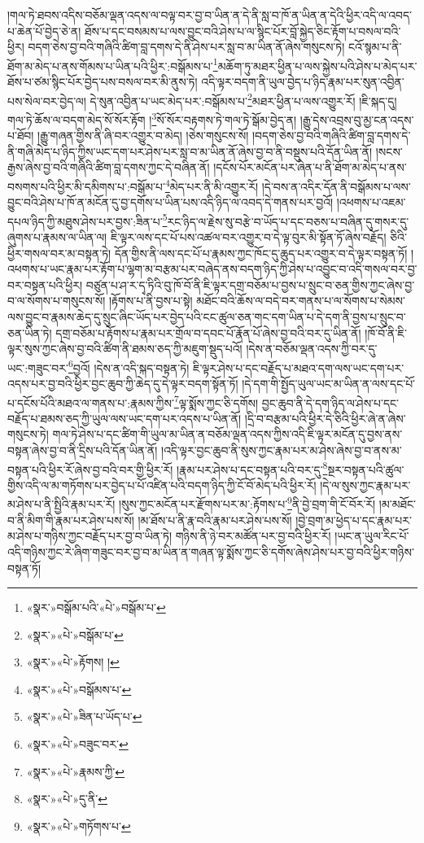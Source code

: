།གལ་ཏེ་ཐབས་འདིས་བཅོམ་ལྡན་འདས་ལ་བལྟ་བར་བྱ་བ་ཡིན་ན་དེ་ནི་སླ་བ་ཁོ་ན་ཡིན་ན་དེའི་ཕྱིར་འདི་ལ་འབད་པ་ཆེན་པོ་བྱེད་ཅེ་ན། ཐོས་པ་དང་བསམས་པ་ལས་བྱུང་བའི་ཤེས་པ་ལ་སྙིང་པོར་བློ་སྐྱེད་ཅིང་རྟོག་པ་བསལ་བའི་ཕྱིར། བདག་ཅེས་བྱ་བའི་གཞིའི་ཚིག་བླ་དགས་དེ་ནི་ཤེས་པར་སླ་བ་མ་ཡིན་ནོ་ཞེས་གསུངས་ཏེ། ངའོ་སྙམ་པ་ནི་ཐོག་མ་མེད་པ་ནས་གོམས་པ་ཡིན་པའི་ཕྱིར་:བསྒོམས་པ་\footnote{«སྣར་»བསྒོམ་པའི་«པེ་»བསྒོམ་པ་}མཆོག་ཏུ་མཐར་ཕྱིན་པ་ལས་སྐྱེས་པའི་ཤེས་པ་མེད་པར་ཐོས་པ་ཙམ་སྙིང་པོར་བྱེད་པས་བསལ་བར་མི་ནུས་ཏེ། འདི་ལྟར་བདག་ནི་ཡུལ་བྱེད་པ་ཉིད་རྣམ་པར་སུན་འབྱིན་པས་སེལ་བར་བྱེད་ལ། དེ་སུན་འབྱིན་པ་ཡང་མེད་པར་:བསྒོམས་པ་\footnote{«སྣར་»«པེ་»བསྒོམ་པ་}མཐར་ཕྱིན་པ་ལས་འགྱུར་རོ། །ཇི་སྐད་དུ། གལ་ཏེ་ཆོས་ལ་བདག་མེད་སོ་སོར་རྟོག །\footnote{«སྣར་»«པེ་»རྟོགས། །}སོ་སོར་བརྟགས་ཏེ་གལ་ཏེ་སྒོམ་བྱེད་ན། །རྒྱུ་དེས་འབྲས་བུ་མྱ་ངན་འདས་པ་ཐོབ། །རྒྱུ་གཞན་གྱིས་ནི་ཞི་བར་འགྱུར་བ་མེད། །ཅེས་གསུངས་སོ། །བདག་ཅེས་བྱ་བའི་གཞིའི་ཚིག་བླ་དགས་དེ་ནི་གཞི་མེད་པ་ཉིད་ཀྱིས་ཡང་དག་པར་ཤེས་པར་སླ་བ་མ་ཡིན་ནོ་ཞེས་བྱ་བ་ནི་བསྡུས་པའི་དོན་ཡིན་ནོ། །སངས་རྒྱས་ཞེས་བྱ་བའི་གཞིའི་ཚིག་བླ་དགས་ཀྱང་དེ་བཞིན་ནོ། །དངོས་པོར་མངོན་པར་ཞེན་པ་ནི་ཐོག་མ་མེད་པ་ནས་བསགས་པའི་ཕྱིར་མི་དམིགས་པ་:བསྒོམ་པ་\footnote{«སྣར་»«པེ་»བསྒོམས་པ་}མེད་པར་ནི་མི་འགྱུར་རོ། །དེ་བས་ན་འདིར་དོན་ནི་བསྒོམས་པ་ལས་བྱུང་བའི་ཤེས་པ་ཁོ་ན་མངོན་དུ་བྱ་དགོས་པ་ཡིན་པས་འདི་ཉིད་ལ་འབད་དེ་གནས་པར་བྱའོ། །འཕགས་པ་འཇམ་དཔལ་ཉིད་ཀྱི་མཐུས་ཤེས་པར་བྱས་:ཟིན་པ་\footnote{«སྣར་»«པེ་»ཟིན་པ་ཡོད་པ་}རང་ཉིད་ལ་རྗེས་སུ་བརྩེ་བ་ཡོད་པ་དང་བཅས་པ་བཞིན་དུ་གསར་དུ་ཞུགས་པ་རྣམས་ལ་ཡིན་ལ། ཇི་ལྟར་ལས་དང་པོ་པས་འཚལ་བར་འགྱུར་བ་དེ་ལྟ་བུར་མི་སྟོན་ཏོ་ཞེས་བརྗོད། ཅིའི་ཕྱིར་གསལ་བར་མ་བསྟན་ཏེ། དོན་གྱིས་ནི་ལས་དང་པོ་པ་རྣམས་ཀྱང་ཁོང་དུ་ཆུད་པར་འགྱུར་བ་དེ་ལྟར་བསྟན་ཏོ། །འཕགས་པ་ཡང་རྣམ་པར་རྟོག་པ་ལྷག་མ་བརྩམ་པར་བཞེད་ནས་བདག་ཉིད་ཀྱི་ཤེས་པ་འབྱུང་བ་འདི་གསལ་བར་བྱ་བར་བསྟན་པའི་ཕྱིར། བཙུན་པ་ཤ་ར་དྭ་ཏིའི་བུ་ཁོ་བོ་ནི་ཇི་ལྟར་དགྲ་བཅོམ་པ་བྱས་པ་སྲུང་བ་ཅན་གྱིས་ཀྱང་ཞེས་བྱ་བ་ལ་སོགས་པ་གསུངས་སོ། །རྟོགས་པ་ནི་བྱས་པ་སྟེ། མཐོང་བའི་ཆོས་ལ་བདེ་བར་གནས་པ་ལ་སོགས་པ་སེམས་ལས་བྱུང་བ་རྣམས་ཆེད་དུ་སྲུང་ཞིང་ཡོད་པར་བྱེད་པའི་ངང་ཚུལ་ཅན་གང་དག་ཡིན་པ་དེ་དག་ནི་བྱས་པ་སྲུང་བ་ཅན་ཡིན་ཏེ། དགྲ་བཅོམ་པ་རྟོགས་པ་རྣམ་པར་གྲོལ་བ་དབང་པོ་རྣོན་པོ་ཞེས་བྱ་བའི་བར་དུ་ཡིན་ནོ། །ཁོ་བོ་ནི་ཇི་ལྟར་སུས་ཀྱང་ཞེས་བྱ་བའི་ཚིག་ནི་ཐམས་ཅད་ཀྱི་མཇུག་སྡུད་པའོ། །དེས་ན་བཅོམ་ལྡན་འདས་ཀྱི་བར་དུ་ཡང་:གཟུང་བར་\footnote{«སྣར་»«པེ་»བཟུང་བར་}བྱའོ། །དེས་ན་འདི་སྐད་བསྟན་ཏེ། ཇི་ལྟར་ཤེས་པ་དང་བརྗོད་པ་མཐའ་དག་ལས་ཡང་དག་པར་འདས་པར་བྱ་བའི་ཕྱིར་བྱང་ཆུབ་ཀྱི་ཆེད་དུ་དེ་ལྟར་བདག་སྟོན་ཏོ། །དེ་དག་གི་སྤྱོད་ཡུལ་ཡང་མ་ཡིན་ན་ལས་དང་པོ་པ་དངོས་པོའི་མཐའ་ལ་གནས་པ་:རྣམས་ཀྱིས་\footnote{«སྣར་»«པེ་»རྣམས་ཀྱི་}ལྟ་སྨོས་ཀྱང་ཅི་དགོས། བྱང་ཆུབ་ནི་དེ་དག་ཉིད་ལ་ཤེས་པ་དང་བརྗོད་པ་ཐམས་ཅད་ཀྱི་ཡུལ་ལས་ཡང་དག་པར་འདས་པ་ཡིན་ནོ། །དྲི་བ་བརྩམ་པའི་ཕྱིར་དེ་ཅིའི་ཕྱིར་ཞེ་ན་ཞེས་གསུངས་ཏེ། གལ་ཏེ་ཤེས་པ་དང་ཚིག་གི་ཡུལ་མ་ཡིན་ན་བཅོམ་ལྡན་འདས་ཀྱིས་འདི་ཇི་ལྟར་མངོན་དུ་བྱས་ནས་བསྟན་ཞེས་བྱ་བ་ནི་དྲིས་པའི་དོན་ཡིན་ནོ། །འདི་ལྟར་བྱང་ཆུབ་ནི་སུས་ཀྱང་རྣམ་པར་མ་ཤེས་ཞེས་བྱ་བ་ནས་མ་བསྟན་པའི་ཕྱིར་རོ་ཞེས་བྱ་བའི་བར་གྱི་ཕྱིར་རོ། །རྣམ་པར་ཤེས་པ་དང་བསྟན་པའི་བར་དུ་\footnote{«སྣར་»«པེ་»དུ་ནི་}སྔར་བསྟན་པའི་ཚུལ་གྱིས་འདི་ལ་མ་གཏོགས་པར་བྱེད་པ་པོ་འཛིན་པའི་བདག་ཉིད་ཀྱི་ངོ་བོ་མེད་པའི་ཕྱིར་རོ། །དེ་ལ་སུས་ཀྱང་རྣམ་པར་མ་ཤེས་པ་ནི་སྤྱིའི་རྣམ་པར་རོ། །སུས་ཀྱང་མངོན་པར་རྫོགས་པར་མ་:རྟོགས་པ་\footnote{«སྣར་»«པེ་»གཏོགས་པ་}ནི་བྱེ་བྲག་གི་ངོ་བོར་རོ། །མ་མཐོང་བ་ནི་མིག་གི་རྣམ་པར་ཤེས་པས་སོ། །མ་ཐོས་པ་ནི་རྣ་བའི་རྣམ་པར་ཤེས་པས་སོ། །བྱེ་བྲག་མ་ཕྱེད་པ་དང་རྣམ་པར་མ་ཤེས་པ་གཉིས་ཀྱང་བརྗོད་པར་བྱ་བ་ཡིན་ཏེ། གཉིས་ནི་ཉེ་བར་མཚོན་པར་བྱ་བའི་ཕྱིར་རོ། །ཡང་ན་ཡུལ་རིང་པོ་འདི་གཉིས་ཀྱང་རེ་ཞིག་གཟུང་བར་བྱ་བ་མ་ཡིན་ན་གཞན་ལྟ་སྨོས་ཀྱང་ཅི་དགོས་ཞེས་ཤེས་པར་བྱ་བའི་ཕྱིར་གཉིས་བསྟན་ཏོ། 